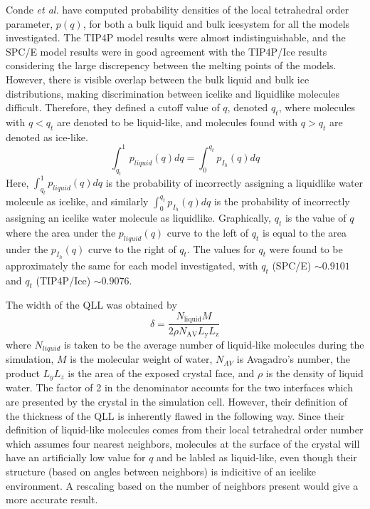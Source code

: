 Conde \textit{et al.} have computed probability densities of the local
tetrahedral order parameter, $p(q)$, for both a bulk liquid and bulk
icesystem for all the models investigated. The TIP4P model results
were almost indistinguishable, and the SPC/E model results were in
good agreement with the TIP4P/Ice results considering the large
discrepency between the melting points of the models. However, there
is visible overlap between the bulk liquid and bulk ice distributions,
making discrimination between icelike and liquidlike molecules
difficult. Therefore, they defined a cutoff value of $q$, denoted
$q_{t}$, where molecules with $q < q_t$ are denoted to be liquid-like,
and molecules found with $q > q_t$ are denoted as ice-like. 
\begin{equation}
\int_{q_t}^{1} p_{liquid}(q)dq = \int_{0}^{q_t} p_{I_h}(q)dq
\end{equation}
Here, $\int_{q_t}^{1} p_{liquid}(q)dq$ is the probability of
incorrectly assigning a liquidlike water molecule as icelike, and
similarly $\int_{0}^{q_t} p_{I_h}(q)dq$ is the probability of
incorrectly assigning an icelike water molecule as
liquidlike. Graphically, $q_t$ is the value of $q$ where the area
under the $p_{liquid}(q)$ curve to the left of $q_t$ is equal to the
area under the $p_{I_h}(q)$ curve to the right of $q_t$.  The values
for $q_t$ were found to be approximately the same for each model
investigated, with $q_t$ (SPC/E) $\sim 0.9101$ and
$q_t$ (TIP4P/Ice) $\sim 0.9076$. 

The width of the QLL was obtained by
\begin{equation}
\delta =
\frac{N_\mathrm{liquid}M}{2\rho N_\mathrm{AV}L_\mathrm{y}L_\mathrm{z}}
\end{equation}
where $N_{liquid}$ is taken to be the average number of liquid-like
molecules during the simulation, $M$ is the molecular weight of water,
$N_{AV}$ is Avagadro's number, the product $L_yL_z$ is the area of the
exposed crystal face, and $\rho$ is the density of liquid water. The
factor of 2 in the denominator accounts for the two interfaces which
are presented by the crystal in the simulation cell. However, their
definition of the thickness of the QLL is inherently flawed in the
following way. Since their definition of liquid-like molecules comes
from their local tetrahedral order number which assumes four nearest
neighbors, molecules at the surface of the crystal will have an
artificially low value for $q$ and be labled as liquid-like, even
though their structure (based on angles between neighbors) is
indicitive of an icelike environment. A rescaling based on the number
of neighbors present would give a more accurate result. 

